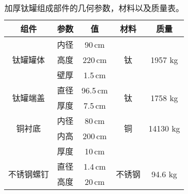   \begin{table*}[hbt]
    \begin{center}
        \caption{加厚钛罐组成部件的几何参数，材料以及质量表。\supercite{cdr}}
        \begin{tabular*}{0.75\textwidth}{@{\extracolsep{\fill}}ccccc}
        \hline
        \hline
        \textbf{组件}   &   \textbf{参数}   &   \textbf{值} &   \textbf{材料} & \textbf{质量} \\ \hline
        \multirow{3}{*}{钛罐罐体} 
            &   内径&   90\,cm&     \multirow{3}{*}{钛} &   \multirow{3}{*}{1957 kg} \\
            &   高度&   220\,cm&    &   \\   
            &   壁厚&   1.5\,cm&    &   \\\hline
        \multirow{2}{*}{钛罐端盖} 
            & 直径 & 96.5\,cm & \multirow{2}{*}{钛} & \multirow{2}{*}{1758 kg} \\
            & 厚度 & 7.5\,cm &  &    \\\hline
        \multirow{2}{*}{铜衬底} 
            & 内径 & 80\,cm & \multirow{2}{*}{铜} & \multirow{2}{*}{14130 kg} \\
            & 内高 & 200\,cm &  &    \\
            & 厚度 & 10\,cm &  & \\\hline
        \multirow{2}{*}{不锈钢螺钉} 
            & 直径 & 1.4\,cm & \multirow{2}{*}{不锈钢} & \multirow{2}{*}{94.6 kg} \\
            & 高度 & 20\,cm &  &    \\
        \hline
        \hline
        \end{tabular*}
        \label{tab:ti_structure_big}
    \end{center}
\end{table*}

